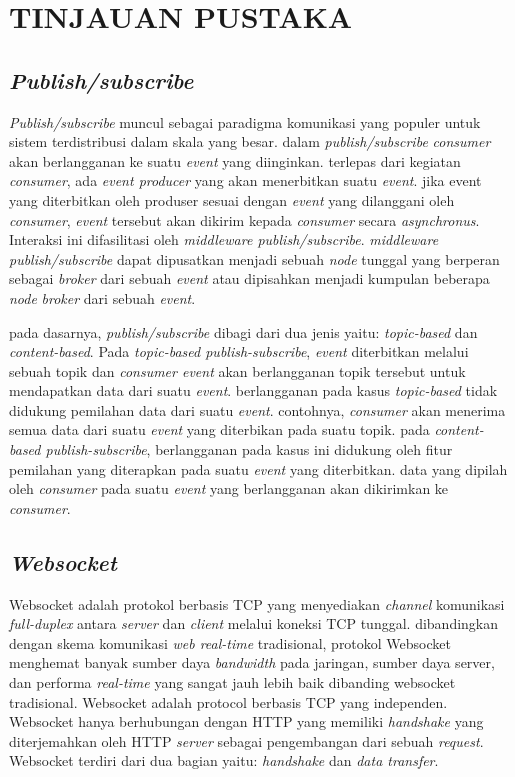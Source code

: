 \chapter{TINJAUAN PUSTAKA}
		\section{\textit{Publish/subscribe}}
			\textit{Publish/subscribe} muncul sebagai paradigma komunikasi yang populer untuk sistem terdistribusi dalam skala yang besar. dalam \textit{publish/subscribe} \textit{consumer} akan berlangganan ke suatu \textit{event} yang diinginkan. terlepas dari kegiatan \textit{consumer}, ada \textit{event producer} yang akan menerbitkan suatu \textit{event}. jika event yang diterbitkan oleh produser sesuai dengan \textit{event} yang dilanggani oleh \textit{consumer}, \textit{event} tersebut akan dikirim kepada \textit{consumer} secara \textit{asynchronus}. Interaksi ini difasilitasi oleh \textit{middleware publish/subscribe}. \textit{middleware publish/subscribe} dapat dipusatkan menjadi sebuah \textit{node} tunggal yang berperan sebagai \textit{broker} dari sebuah \textit{event} atau dipisahkan menjadi kumpulan beberapa \textit{node} \textit{broker} dari sebuah \textit{event}. 
			
			pada dasarnya, \textit{publish/subscribe} dibagi dari dua jenis yaitu: \textit{topic-based} dan \textit{content-based}. Pada \textit{topic-based publish-subscribe}, \textit{event} diterbitkan melalui sebuah topik dan \textit{consumer event} akan berlangganan topik tersebut untuk mendapatkan data dari suatu \textit{event}. berlangganan pada kasus \textit{topic-based} tidak didukung pemilahan data dari suatu \textit{event}. contohnya, \textit{consumer} akan menerima semua data dari suatu \textit{event} yang diterbikan pada suatu topik. pada \textit{content-based publish-subscribe}, berlangganan pada kasus ini didukung oleh fitur pemilahan yang diterapkan pada suatu \textit{event} yang diterbitkan. data yang dipilah oleh \textit{consumer} pada suatu \textit{event} yang berlangganan akan dikirimkan ke \textit{consumer}. \cite{noauthor_what_2016}
			
		\section{\textit{Websocket}}
          	Websocket adalah protokol berbasis TCP yang menyediakan \textit{channel} komunikasi \textit{full-duplex} antara \textit{server} dan \textit{client} melalui koneksi TCP tunggal. dibandingkan dengan skema komunikasi \textit{web real-time} tradisional, protokol Websocket menghemat banyak sumber daya \textit{bandwidth} pada jaringan, sumber daya server, dan performa \textit{real-time} yang sangat jauh lebih baik dibanding websocket tradisional. Websocket adalah protocol berbasis TCP yang independen. Websocket hanya berhubungan dengan HTTP yang memiliki \textit{handshake} yang diterjemahkan oleh HTTP \textit{server} sebagai pengembangan dari sebuah \textit{request}. Websocket terdiri dari dua bagian yaitu: \textit{handshake} dan \textit{data transfer}.
           		

